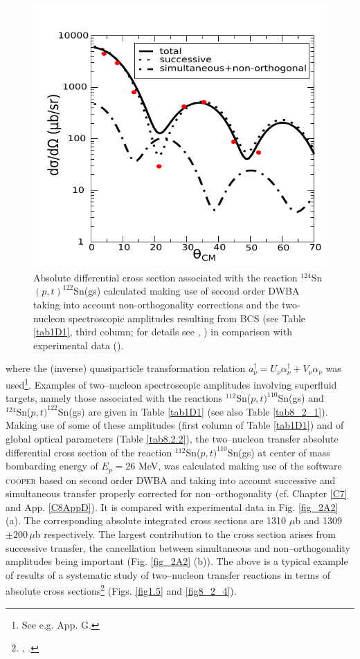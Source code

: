 \begin{figure}\label{fig2A3}
\centerline{\includegraphics*[width=\textwidth,angle=0]{nutshell/figs/fig2A3_v2}}
\caption{Absolute differential cross section associated with the reaction $^{124}$Sn$(p,t)^{122}$Sn(gs) calculated making use of second order DWBA taking into account non-orthogonality corrections and the two-nucleon spectroscopic amplitudes resulting from BCS (see Table \ref{tab1D1}, third column; for details see \cite{Potel:13}, \cite{Potel:13b}) in comparison with experimental data (\cite{Guazzoni:11}).}\label{fig_2A3}
\end{figure}
where the (inverse) quasiparticle transformation relation $a^{\dagger}_\nu=U_{\nu}\alpha^{\dagger}_{\nu}+V_{\nu}\alpha_{\bar{\nu}}$ was used\footnote{See e.g. \cite{Brink:05} App. G.}. Examples of  two--nucleon spectroscopic amplitudes involving superfluid targets, namely those associated with the reactions $^{112}$Sn($p,t)^{110}$Sn(gs) and\\ $^{124}$Sn($p,t)^{122}$Sn(gs) are given in Table \ref{tab1D1} (see also Table \ref{tab8_2_1}). Making use of some of these amplitudes (first column of Table \ref{tab1D1}) and of global optical parameters (Table \ref{tab8.2.2}), the two--nucleon transfer absolute differential cross section of the reaction $^{112}$Sn($p,t)^{110}$Sn(gs) at center of mass bombarding energy of $E_p=26$ MeV, was calculated making use of the software \textsc{cooper} based on second order DWBA and taking into account successive and simultaneous transfer properly corrected for non--orthogonality (cf. Chapter \ref{C7} and App. \ref{C8AppD}). It is compared with experimental data in Fig. \ref{fig_2A2} (a). The corresponding absolute integrated cross sections are 1310 $\mu$b and 1309$\pm 200 \,\mu$b respectively. The largest contribution to the cross section arises from successive transfer, the cancellation between simultaneous and non--orthogonality amplitudes being important (Fig. \ref{fig_2A2} (b)). The above is a typical example of results of a systematic study of two--nucleon transfer reactions in terms of absolute cross sections\footnote{\cite{Potel:13}, \cite{Potel:13b}.} (Figs. \ref{fig1.5} and  \ref{fig8_2_4}).


